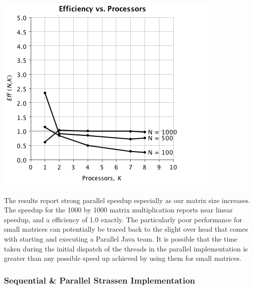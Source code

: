 \documentclass{dependencies/acm_proc_article-sp}
\begin{document}
\begin{center}
\includegraphics[scale=0.5]{images/parallel/eff-vs-proc.png}
\end{center}
The results report strong parallel speedup especially as our matrix 
size increases. The speedup for the 1000 by 1000 matrix multiplication reports
near linear speedup, and a efficiency of 1.0 exactly. The particularly poor performance
for small matrices can potentially be traced back to the slight over head
that comes with starting and executing a Parallel Java team. It is possible that the time taken during
the initial dispatch of the threads in the parallel implementation is greater
than any possible speed up achieved by using them for small matrices.


\subsubsection{Sequential \& Parallel Strassen Implementation}
\end{document}
